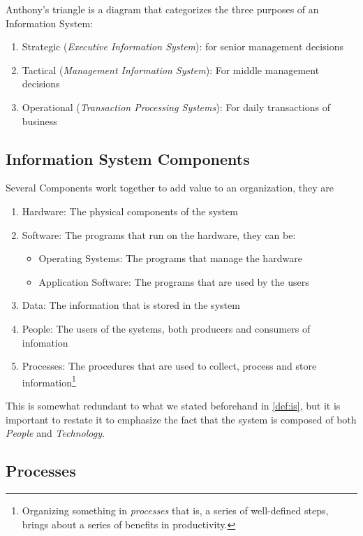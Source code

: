 \documentclass[openright, twoside, twocolumn]{report}
\begin{document}
    Anthony's triangle is a diagram that categorizes the three purposes of an Information System:

    \begin{enumerate}
      \item Strategic (\emph{Executive Information System}): for senior management decisions
      \item Tactical (\emph{Management Information System}): For middle management decisions
      \item Operational (\emph{Transaction Processing Systems}): For daily transactions of business
    \end{enumerate}

    \subsection{Information System Components}
    Several Components work together to add value to an organization, they are

    \begin{enumerate}
      \item Hardware: The physical components of the system
      \item Software: The programs that run on the hardware, they can be:
      \begin{itemize}
        \item Operating Systems: The programs that manage the hardware
        \item Application Software: The programs that are used by the users
      \end{itemize}
      \item Data: The information that is stored in the system
      \item People: The users of the systems, both producers and consumers of infomation
      \item Processes: The procedures that are used to collect, process and store information\footnote{%
        Organizing something in \emph{processes} that is, a series of well-defined steps, brings about a series of
        benefits in productivity.
      }
    \end{enumerate}

    This is somewhat redundant to what we stated beforehand in \cref{def:is}, but it is important to restate it to
    emphasize the fact that the system is composed of both \emph{People} and \emph{Technology}.

    \subsection{Processes}
\end{document}
